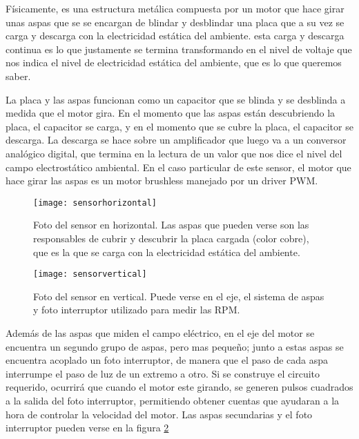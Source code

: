 Físicamente, es una estructura metálica compuesta por un motor que hace girar unas aspas que se se encargan de blindar y desblindar una placa que a su vez se carga y descarga con la electricidad estática del ambiente. esta carga y descarga continua es lo que justamente se termina transformando en el nivel de voltaje que nos indica el nivel de electricidad estática del ambiente, que es lo que queremos saber.

La placa y las aspas funcionan como un capacitor que se blinda y se des\-blinda a medida que el motor gira. En el momento que las aspas están descubriendo la placa, el capacitor se carga, y en el momento que se cubre la placa, el capacitor se descarga. La descarga se hace sobre un amplificador que luego va a un conversor analógico digital, que termina en la lectura de un valor que nos dice el nivel del campo electrostático ambiental. En el caso particular de este sensor, el motor que hace girar las aspas es un motor brushless manejado por un driver PWM.

\begin{figure}[h]
  \centering
  \texttt{[image: sensorhorizontal]}
  \caption[Imagen del sensor de campo electrostático utilizado (horizontal)]{Foto del sensor en horizontal. Las aspas que pueden verse son las responsables de cubrir y descubrir la placa cargada (color cobre), que es la que se carga con la electricidad estática del ambiente.}\label{fig:sensorhorizontal}
\end{figure}

\begin{figure}[h]
  \centering
  \texttt{[image: sensorvertical]}
  \caption[Imagen del sensor de campo electrostático utilizado (vertical)]{Foto del sensor en vertical. Puede verse en el eje, el sistema de aspas y foto interruptor utilizado para medir las RPM.}\label{fig:sensorvertical}
\end{figure}

Además de las aspas que miden el campo eléctrico, en el eje del motor se encuentra un segundo grupo de aspas, pero mas pequeño; junto a estas aspas se encuentra acoplado un foto interruptor, de manera que el paso de cada aspa interrumpe el paso de luz de un extremo a otro. Si se construye el circuito requerido, ocurrirá que cuando el motor este girando, se generen pulsos cuadrados a la salida del foto interruptor, permitiendo obtener cuentas que ayudaran a la hora de controlar la velocidad del motor. Las aspas secundarias y el foto interruptor pueden verse en la figura \ref{fig:sensorvertical}

